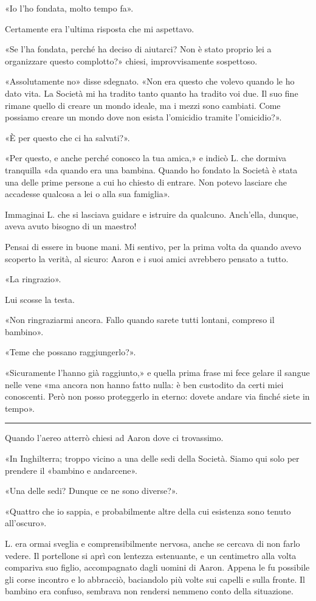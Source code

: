 «Io l'ho fondata, molto tempo fa».

Certamente era l'ultima risposta che mi aspettavo.

«Se l'ha fondata, perché ha deciso di aiutarci? Non è stato proprio lei a organizzare questo
complotto?» chiesi, improvvisamente sospettoso.

«Assolutamente no» disse sdegnato. «Non era questo che volevo quando le ho dato vita. La Società mi
ha tradito tanto quanto ha tradito voi due. Il suo fine rimane quello di creare un mondo ideale, ma
i mezzi sono cambiati. Come possiamo creare un mondo dove non esista l'omicidio tramite
l'omicidio?».

«È per questo che ci ha salvati?».

«Per questo, e anche perché conosco la tua amica,» e indicò L. che dormiva tranquilla «da quando era
una bambina. Quando ho fondato la Società è stata una delle prime persone a cui ho chiesto di
entrare. Non potevo lasciare che accadesse qualcosa a lei o alla sua famiglia».

Immaginai L. che si lasciava guidare e istruire da qualcuno. Anch'ella, dunque, aveva avuto bisogno
di un maestro!

Pensai di essere in buone mani. Mi sentivo, per la prima volta da quando avevo scoperto la verità,
al sicuro: Aaron e i suoi amici avrebbero pensato a tutto.

«La ringrazio».

Lui scosse la testa.

«Non ringraziarmi ancora. Fallo quando sarete tutti lontani, compreso il bambino».

«Teme che possano raggiungerlo?».

«Sicuramente l'hanno già raggiunto,» e quella prima frase mi fece gelare il sangue nelle vene «ma
ancora non hanno fatto nulla: è ben custodito da certi miei conoscenti. Però non posso proteggerlo
in eterno: dovete andare via finché siete in tempo».

\plainbreak{1}

Quando l'aereo atterrò chiesi ad Aaron dove ci trovassimo.

«In Inghilterra; troppo vicino a una delle sedi della Società. Siamo qui solo per prendere il
«bambino e andarcene».

«Una delle sedi? Dunque ce ne sono diverse?».

«Quattro che io sappia, e probabilmente altre della cui esistenza sono tenuto all'oscuro».

L. era ormai sveglia e comprensibilmente nervosa, anche se cercava di non farlo vedere. Il
portellone si aprì con lentezza estenuante, e un centimetro alla volta compariva suo figlio,
accompagnato dagli uomini di Aaron. Appena le fu possibile gli corse incontro e lo abbracciò,
baciandolo più volte sui capelli e sulla fronte. Il bambino era confuso, sembrava non rendersi
nemmeno conto della situazione.

